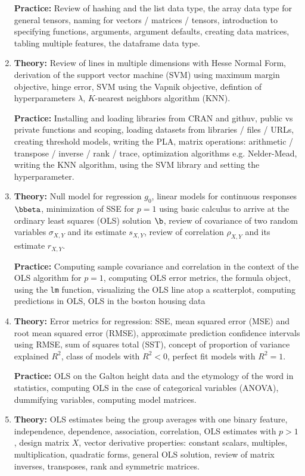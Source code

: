 \begin{enumerate}[(1)]
\textbf{Practice:} Review of hashing and the list data type, the array data type for general tensors, naming for vectors / matrices / tensors, introduction to specifying functions, arguments, argument defaults, creating data matrices, tabling multiple features, the dataframe data type.

\item \textbf{Theory:} Review of lines in multiple dimensions with Hesse Normal Form, derivation of the support vector machine (SVM) using maximum margin objective, hinge error, SVM using the Vapnik objective, defintion of hyperparameters $\lambda$, $K$-nearest neighbors algorithm (KNN).

\textbf{Practice:} Installing and loading libraries from CRAN and githuv, public vs private functions and scoping, loading datasets from libraries / files / URLs, creating threshold models, writing the PLA, matrix operations: arithmetic / transpose / inverse / rank / trace, optimization algorithms e.g. Nelder-Mead, writing the KNN algorithm, using the SVM library and setting the hyperparameter.

\item \textbf{Theory:} Null model for regression $g_0$, linear models for continuous responses $\bbeta$, minimization of SSE for $p=1$ using basic calculus to arrive at the ordinary least squares (OLS) solution $\b$, review of covariance of two random variables $\sigma_{X,Y}$ and its estimate $s_{X,Y}$, review of correlation $\rho_{X,Y}$ and its estimate $r_{X,Y}$.

\textbf{Practice:} Computing sample covariance and correlation in the context of the OLS algorithm for $p=1$, computing OLS error metrics, the formula object, using the \texttt{lm} function, visualizing the OLS line atop a scatterplot, computing predictions in OLS, OLS in the boston housing data

\item \textbf{Theory:} Error metrics for regression: SSE, mean squared error (MSE) and root mean squared error (RMSE), approximate prediction confidence intervals using RMSE, sum of squares total (SST), concept of proportion of variance explained $R^2$, class of models with $R^2 < 0$, perfect fit models with $R^2 = 1$.

\textbf{Practice:} OLS on the Galton height data and the etymology of the word  in statistics, computing OLS in the case of categorical variables (ANOVA), dummifying variables, computing model matrices.

\item \textbf{Theory:} OLS estimates being the group averages with one binary feature, independence, dependence, association, correlation, OLS estimates with $p>1$, design matrix $X$, vector derivative properties: constant scalars, multiples, multiplication, quadratic forms, general OLS solution, review of matrix inverses, transposes, rank and symmetric matrices.


\end{enumerate}
